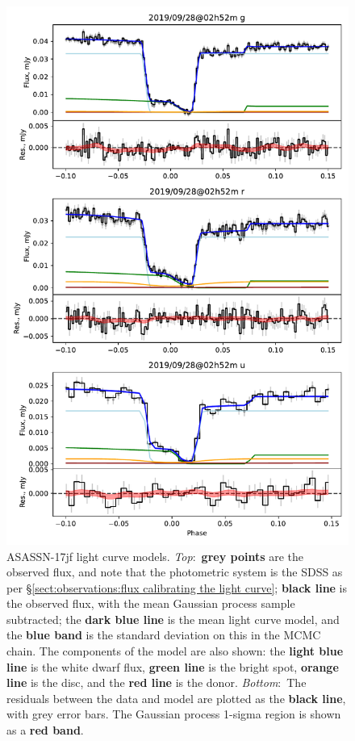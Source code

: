 \begin{figure}
    \centering
    \includegraphics[width=.9\textwidth]{figures/results/three_cvs_with_weird_colours/ASASSN-17jf/ASASSN-17jf_1.pdf}
    \caption{ASASSN-17jf light curve models. {\it Top}:~{\bf grey points} are the observed flux, and note that the photometric system is the SDSS as per \S\ref{sect:observations:flux calibrating the light curve}; {\bf black line} is the observed flux, with the mean Gaussian process sample subtracted; the {\bf dark blue line} is the mean light curve model, and the {\bf blue band} is the standard deviation on this in the MCMC chain. The components of the model are also shown: the {\bf light blue line} is the white dwarf flux, {\bf green line} is the bright spot, {\bf orange line} is the disc, and the {\bf red line} is the donor. {\it Bottom}:~The residuals between the data and model are plotted as the {\bf black line}, with grey error bars. The Gaussian process 1-sigma region is shown as a {\bf red band}.}
    \label{fig:ASASSN-17jf all light curves}
\end{figure}
